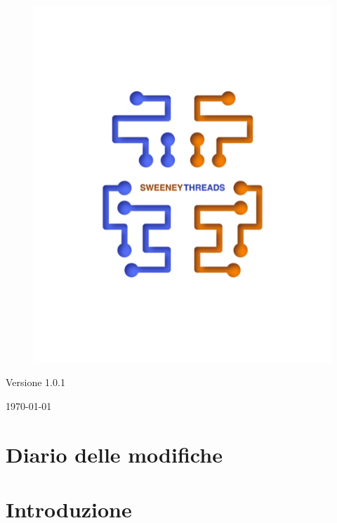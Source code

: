 \documentclass[a4paper]{article}
\begin{document}
\begin{titlepage}
		\begin{figure}[H]
			\centering
			\includegraphics[scale=0.8]{sweeney.png}
		\end{figure}
		\begin{center}
			Versione 1.0.1
		\end{center}
		{\large \today}\\[3cm] 
		\vfill  
	\end{titlepage}
	
	
	\tableofcontents
	
	\newpage
	\section*{Diario delle modifiche}

	\newpage 
    \section{Introduzione}
\end{document}
